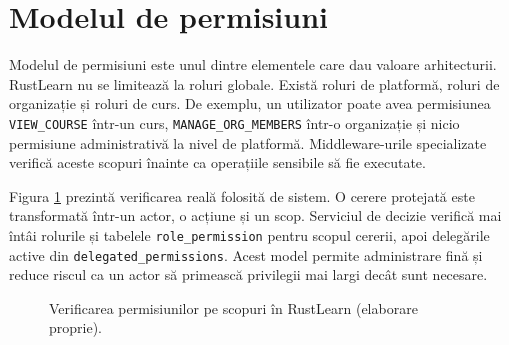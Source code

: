 \section{Modelul de permisiuni}
Modelul de permisiuni este unul dintre elementele care dau valoare arhitecturii. RustLearn nu se limitează la roluri globale. Există roluri de platformă, roluri de organizație și roluri de curs. De exemplu, un utilizator poate avea permisiunea \texttt{VIEW\_COURSE} într-un curs, \texttt{MANAGE\_ORG\_MEMBERS} într-o organizație și nicio permisiune administrativă la nivel de platformă. Middleware-urile specializate verifică aceste scopuri înainte ca operațiile sensibile să fie executate.

Figura \ref{fig:permisiuni} prezintă verificarea reală folosită de sistem. O cerere protejată este transformată într-un actor, o acțiune și un scop. Serviciul de decizie verifică mai întâi rolurile și tabelele \texttt{role\_permission} pentru scopul cererii, apoi delegările active din \texttt{delegated\_permissions}. Acest model permite administrare fină și reduce riscul ca un actor să primească privilegii mai largi decât sunt necesare.

\begin{figure}[H]
    \centering
    \caption{Verificarea permisiunilor pe scopuri în RustLearn (elaborare proprie).}
    \label{fig:permisiuni}
\end{figure}

